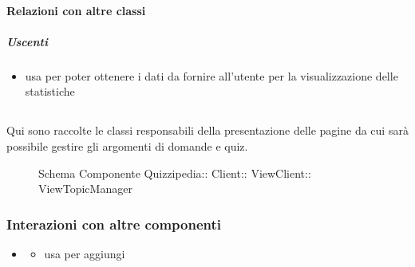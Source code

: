 \paragraph{Relazioni con altre classi}
\subparagraph{Uscenti}
\begin{itemize}
\item usa  per poter ottenere i dati da fornire all'utente per la visualizzazione delle statistiche
\end{itemize}
\subsection{}
Qui sono raccolte le classi responsabili della presentazione delle pagine da cui sarà possibile gestire gli argomenti di domande e quiz.
\begin{figure}[H]
\centering
\noindent{}
\caption[Schema Componente ViewTopicManager]{Schema Componente Quizzipedia:: Client:: ViewClient:: ViewTopicManager}
\end{figure}
\subsubsection{Interazioni con altre componenti}
\begin{itemize}
\item {}
\begin{itemize}
\item usa  per aggiungi
\end{itemize}
\end{itemize}
